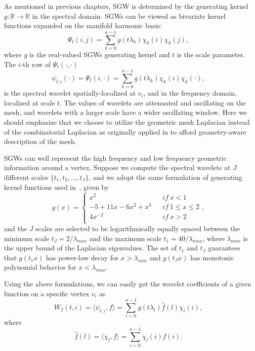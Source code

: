 As mentioned in previous chapters,  SGW is determined by the generating
kernel $g \colon \mathbb{R} \rightarrow \mathbb{R}$ in the spectral domain.
SGWs can be viewed as bivariate kernel functions expanded on the manifold
harmonic basis:
\begin{equation}
\label{eq:SGW}
\Psi_{t}(i,j)=\sum_{k=0}^{n-1}g(t\lambda_k) \chi_k(i)\chi_k(j),
\end{equation}
where $g$ is the real-valued SGWs generating kernel and $t$ is the
scale parameter. The $i$-th row of $\Psi_{t}(\cdot,\cdot)$
\begin{equation}
\label{eq:SGW_vert}
\psi_{t,i}(\cdot) = \Psi_{t}(i,\cdot)=\sum_{k=0}^{n-1}g(t\lambda_k) \chi_k(i)\chi_k(\cdot),
\end{equation}
is the spectral wavelet spatially-localized at $v_i$, and in the
frequency domain, localized at scale $t$. The values of wavelets are
attenuated and oscillating on the mesh, and wavelets with a larger
scale have a wider oscillating window. Here we should emphasize that we
choose to utilize the geometric mesh Laplacian instead of the
combinatorial Laplacian as originally applied in \cite{Hammond2011}
to afford geometry-aware description of the mesh.

SGWs can well represent the high frequency and low frequency geometric
information around a vertex. Suppose we compute the spectral wavelets
at $J$ different scales $\{t_1,t_2,...,t_J\}$, and we adopt the same
formulation of generating kernel functions used in~\cite{Hammond2011},
given by
\begin{equation}
g(x)=\left\{
\begin{array}{lcl}
x^2                &      & {if\  x<1}\\
-5 +11x-6x^2 +x^3  &      & {if\  1 \leq x \leq 2}\\
4x^{-2}            &      & {if\  x>2}\\
\end{array} \right.,
\end{equation}
and the $J$ scales are selected to be logarithmically equally spaced
between the minimum scale $t_J = 2/\lambda_{max}$ and the maximum
scale $t_1=40/\lambda_{max}$, where $\lambda_{max}$ is the upper bound
of the Laplacian eigenvalues. The set of $t_1$ and $t_J$ guarantees
that $g(t_1 x)$ has power-law decay for $x>\lambda_{min}$ and $g(t_J
x)$ has monotonic polynomial behavior for $x<\lambda_{max}$.

Using the above formulations, we can easily get the wavelet
coefficients of a given function on a specific vertex $v_i$ as
\begin{equation}
\label{eq:WMD}
W_f(t,i) = \langle \psi_{t,i},f \rangle = \sum_{l=0}^{n-1}g(t\lambda_l)\hat{f}(l)\chi_l(i),
\end{equation}
where
\begin{equation}
  \hat{f}(l) = \langle \chi_l,f \rangle = \sum_{i=0}^{n-1} \chi_l(i)f(i).
\end{equation}

